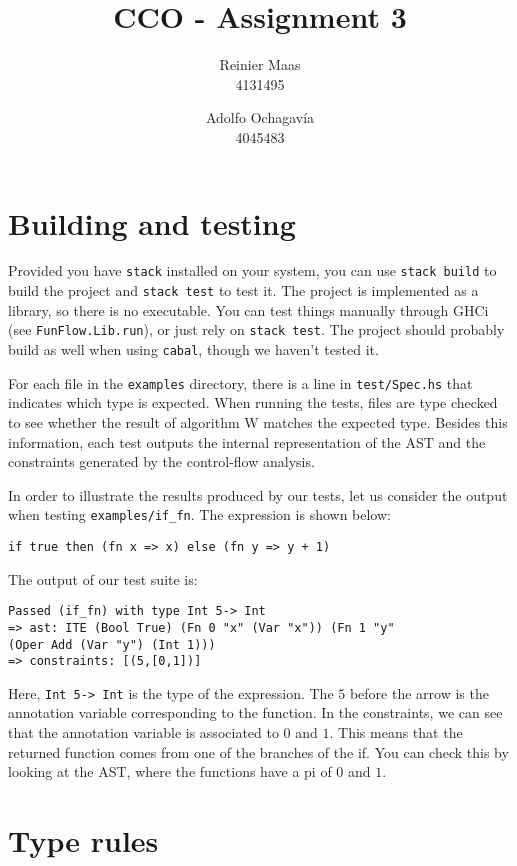 \documentclass{article}
\author{
  Reinier Maas \\ 4131495
  \and
  Adolfo Ochagavía \\ 4045483
}
\title{CCO - Assignment 3}
\begin{document}
\maketitle

\section{Building and testing}

Provided you have \texttt{stack} installed on your system, you can use \texttt{stack build} to build the project and \texttt{stack test} to test it.
The project is implemented as a library, so there is no executable. You can test things manually through GHCi (see \texttt{FunFlow.Lib.run}), or just rely on \texttt{stack test}.
The project should probably build as well when using \texttt{cabal}, though we haven't tested it.

For each file in the \texttt{examples} directory, there is a line in \texttt{test/Spec.hs} that indicates which type is expected. When running the tests, files are type checked to see whether the result of algorithm W matches the expected type. Besides this information, each test outputs the internal representation of the AST and the constraints generated by the control-flow analysis.

In order to illustrate the results produced by our tests, let us consider the output when testing \texttt{examples/if\_fn}. The expression is shown below:

\begin{verbatim}
if true then (fn x => x) else (fn y => y + 1)
\end{verbatim}

The output of our test suite is:

\begin{verbatim}
Passed (if_fn) with type Int 5-> Int
=> ast: ITE (Bool True) (Fn 0 "x" (Var "x")) (Fn 1 "y"
(Oper Add (Var "y") (Int 1)))
=> constraints: [(5,[0,1])]
\end{verbatim}

Here, \texttt{Int 5-> Int} is the type of the expression. The $5$ before the arrow is the annotation variable corresponding to the function. In the constraints, we can see that the annotation variable is associated to $0$ and $1$. This means that the returned function comes from one of the branches of the if. You can check this by looking at the AST, where the functions have a pi of $0$ and $1$.

\section{Type rules}
\end{document}
